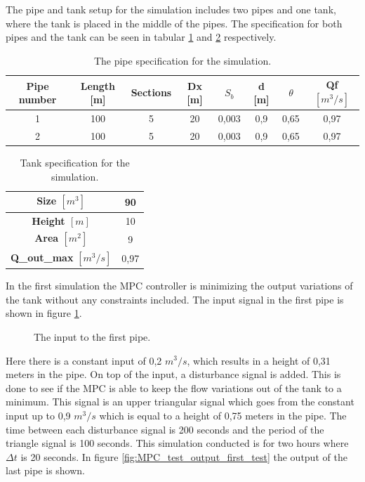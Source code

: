 The pipe and tank setup for the simulation includes two pipes and one tank, where the tank is placed in the middle of the pipes. The specification for both pipes and the tank can be seen in tabular \ref{tab:pipe_data_for_mpc_test} and \ref{tab:tank_data_for_mpc_test} respectively.

\begin{table}[H]
\centering
\begin{tabular}{|c|c|c|c|c|c|c|c|}
\hline
	\rowcolor[HTML]{9B9B9B} 
\textbf{Pipe number} & \textbf{Length} [m] & \textbf{Sections} & \textbf{Dx} [m] & \textbf{$S_b$} & \textbf{d} [m] & \textbf{$\theta$} & \textbf{Qf $[m^3/s]$} \\ \hline
1&100             & 5                 & 20          & 0,003       & 0,9        & 0,65              & 0,97        \\ \hline
2&100             & 5                 & 20          & 0,003       & 0,9        & 0,65              & 0,97        \\ \hline
\end{tabular}
\caption{The pipe specification for the simulation.}
\label{tab:pipe_data_for_mpc_test}
\end{table}
\begin{table}[H]
\centering
\begin{tabular}{|c|c|}
\hline
\textbf{Size $[m^3]$}        & 90   \\ \hline
\textbf{Height $[m]$}      & 10   \\ \hline
\textbf{Area $[m^2]$}        & 9    \\ \hline
\textbf{Q\_out\_max} $[m^3/s]$& 0,97 \\ \hline
\end{tabular}
\caption{Tank specification for the simulation.}
\label{tab:tank_data_for_mpc_test}
\end{table}

In the first simulation the MPC controller is minimizing the output variations of the tank without any constraints included. The input signal in the first pipe is shown in figure \ref{fig:input_to_pipe_mpc_test}. 
\begin{figure}[H]
 \centering
 
\caption{The input to the first pipe.}
\label{fig:input_to_pipe_mpc_test}
\end{figure}

Here there is a constant input of 0,2 $m^3/s$, which results in a height of 0,31 meters in the pipe. On top of the input, a disturbance signal is added. This is done to see if the MPC is able to keep the flow variations out of the tank to a minimum. This signal is an upper triangular signal which goes from the constant input up to 0,9 $m^3/s$ which is equal to a height of 0,75 meters in the pipe. The time between each disturbance signal is 200 seconds and the period of the triangle signal is 100 seconds. This simulation conducted is for two hours where $\Delta t$ is 20 seconds. In figure \ref{fig:MPC_test_output_first_test} the output of the last pipe is shown.  


